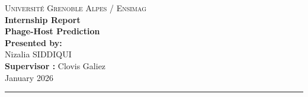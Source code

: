 \thispagestyle{empty}
\begin{center}
    \vspace*{1.5cm}
    {\Large \textsc{Université Grenoble Alpes / Ensimag}}\\[0.6cm]
    
    {\Huge \textbf{Internship Report}}\\[1cm]
    {\Large \textbf{Phage-Host Prediction}}\\[3cm]
    
    \textbf{Presented by:}\\[0.4cm]
    \Large Nizalia SIDDIQUI \\ 

    
    \textbf{Supervisor :} Clovis Galiez \\[2.2cm]
    
    {\large January 2026}\\[1cm]
    \rule{0.8\textwidth}{1pt}
\end{center}

\newpage